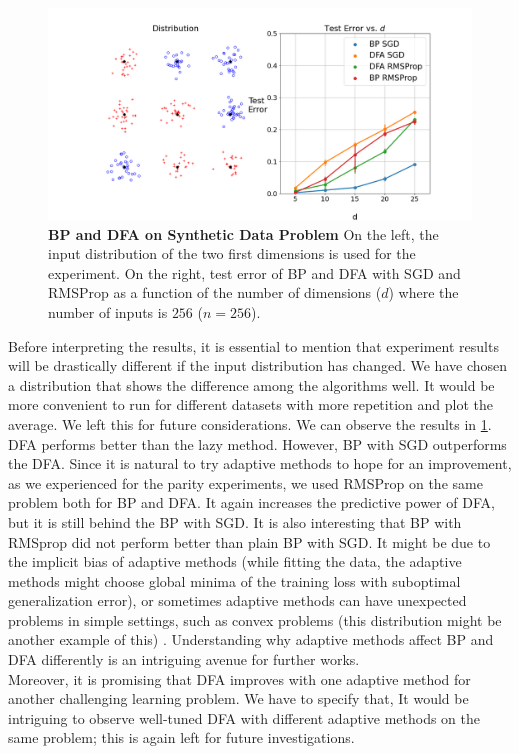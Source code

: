 \documentclass[a4paper, nobind]{templates/ociamthesis}
\begin{document}
\begin{figure}

{\centering \includegraphics[width=1\linewidth]{figures/3_syntheticData_adaptive} 

}

\caption[BP and DFA on Synthetic Data Problem]{\textbf{BP and DFA on Synthetic Data Problem} \newline On the left, the input distribution of the two first dimensions is used for the experiment. On the right, test error of BP and DFA with SGD and RMSProp as a function of the number of dimensions ($d$) where the number of inputs is $256$ ($n = 256$).}\label{fig:DFARandom}
\end{figure}

\noindent Before interpreting the results, it is essential to mention that experiment results will be drastically different if the input distribution has changed. We have chosen a distribution that shows the difference among the algorithms well. It would be more convenient to run for different datasets with more repetition and plot the average. We left this for future considerations.
\noindent We can observe the results in \ref{fig:DFARandom}. DFA performs better than the lazy method. However, BP with SGD outperforms the DFA. Since it is natural to try adaptive methods to hope for an improvement, as we experienced for the parity experiments, we used RMSProp on the same problem both for BP and DFA. It again increases the predictive power of DFA, but it is still behind the BP with SGD. It is also interesting that BP with RMSprop did not perform better than plain BP with SGD. It might be due to the implicit bias of adaptive methods (while fitting the data, the adaptive methods might choose global minima of the training loss with suboptimal generalization error), or sometimes adaptive methods can have unexpected problems in simple settings, such as convex problems (this distribution might be another example of this) \cite{reddi2019convergence}. Understanding why adaptive methods affect BP and DFA differently is an intriguing avenue for further works.\\
\noindent Moreover, it is promising that DFA improves with one adaptive method for another challenging learning problem. We have to specify that, It would be intriguing to observe well-tuned DFA with different adaptive methods on the same problem; this is again left for future investigations.\\
\end{document}
